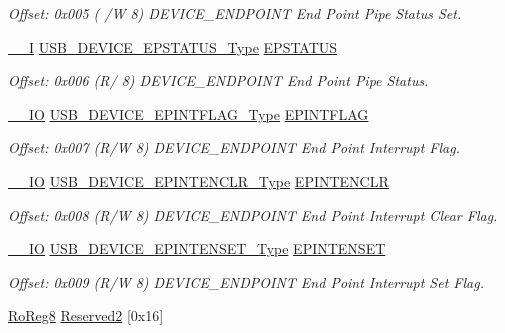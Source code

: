 \begin{DoxyCompactItemize}
\begin{DoxyCompactList}\small\item\em Offset\+: 0x005 ( /W 8) D\+E\+V\+I\+C\+E\+\_\+\+E\+N\+D\+P\+O\+I\+NT End Point Pipe Status Set. \end{DoxyCompactList}\item 
\mbox{\hyperlink{core__cm0plus_8h_af63697ed9952cc71e1225efe205f6cd3}{\+\_\+\+\_\+I}} \mbox{\hyperlink{union_u_s_b___d_e_v_i_c_e___e_p_s_t_a_t_u_s___type}{U\+S\+B\+\_\+\+D\+E\+V\+I\+C\+E\+\_\+\+E\+P\+S\+T\+A\+T\+U\+S\+\_\+\+Type}} \mbox{\hyperlink{struct_usb_device_endpoint_ad4a7b57b4deae20f2d888ad33316a664}{E\+P\+S\+T\+A\+T\+US}}
\begin{DoxyCompactList}\small\item\em Offset\+: 0x006 (R/ 8) D\+E\+V\+I\+C\+E\+\_\+\+E\+N\+D\+P\+O\+I\+NT End Point Pipe Status. \end{DoxyCompactList}\item 
\mbox{\hyperlink{core__cm0plus_8h_aec43007d9998a0a0e01faede4133d6be}{\+\_\+\+\_\+\+IO}} \mbox{\hyperlink{union_u_s_b___d_e_v_i_c_e___e_p_i_n_t_f_l_a_g___type}{U\+S\+B\+\_\+\+D\+E\+V\+I\+C\+E\+\_\+\+E\+P\+I\+N\+T\+F\+L\+A\+G\+\_\+\+Type}} \mbox{\hyperlink{struct_usb_device_endpoint_a23320ab7e1bdcf41514217fb2ad9d035}{E\+P\+I\+N\+T\+F\+L\+AG}}
\begin{DoxyCompactList}\small\item\em Offset\+: 0x007 (R/W 8) D\+E\+V\+I\+C\+E\+\_\+\+E\+N\+D\+P\+O\+I\+NT End Point Interrupt Flag. \end{DoxyCompactList}\item 
\mbox{\hyperlink{core__cm0plus_8h_aec43007d9998a0a0e01faede4133d6be}{\+\_\+\+\_\+\+IO}} \mbox{\hyperlink{union_u_s_b___d_e_v_i_c_e___e_p_i_n_t_e_n_c_l_r___type}{U\+S\+B\+\_\+\+D\+E\+V\+I\+C\+E\+\_\+\+E\+P\+I\+N\+T\+E\+N\+C\+L\+R\+\_\+\+Type}} \mbox{\hyperlink{struct_usb_device_endpoint_a70a309a4cf48aff78691b087172dabe5}{E\+P\+I\+N\+T\+E\+N\+C\+LR}}
\begin{DoxyCompactList}\small\item\em Offset\+: 0x008 (R/W 8) D\+E\+V\+I\+C\+E\+\_\+\+E\+N\+D\+P\+O\+I\+NT End Point Interrupt Clear Flag. \end{DoxyCompactList}\item 
\mbox{\hyperlink{core__cm0plus_8h_aec43007d9998a0a0e01faede4133d6be}{\+\_\+\+\_\+\+IO}} \mbox{\hyperlink{union_u_s_b___d_e_v_i_c_e___e_p_i_n_t_e_n_s_e_t___type}{U\+S\+B\+\_\+\+D\+E\+V\+I\+C\+E\+\_\+\+E\+P\+I\+N\+T\+E\+N\+S\+E\+T\+\_\+\+Type}} \mbox{\hyperlink{struct_usb_device_endpoint_a1dd72ffb8a0460966cf950b285f79e75}{E\+P\+I\+N\+T\+E\+N\+S\+ET}}
\begin{DoxyCompactList}\small\item\em Offset\+: 0x009 (R/W 8) D\+E\+V\+I\+C\+E\+\_\+\+E\+N\+D\+P\+O\+I\+NT End Point Interrupt Set Flag. \end{DoxyCompactList}\item 
\mbox{\hyperlink{group___s_a_m_d21_e15_a__definitions_ga0d957f1433aaf5d70e4dc2b68288442d}{Ro\+Reg8}} \mbox{\hyperlink{struct_usb_device_endpoint_ae1a87a5a7a573aef81319e37b8a8e3d3}{Reserved2}} \mbox{[}0x16\mbox{]}
\end{DoxyCompactItemize}


